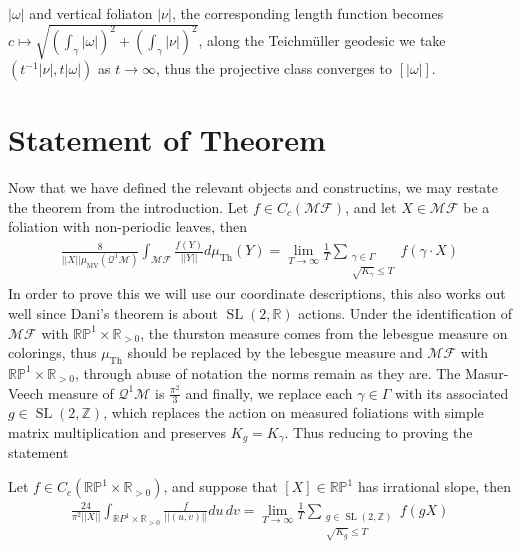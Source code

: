 \documentclass{article}
\newcommand{\abs}[1]{\left\vert#1\right\vert}
\newcommand{\norm}[1]{\lvert\lvert#1\rvert\rvert}
\newcommand{\slr}{\operatorname{SL}(2,\mathbb{R})}
\newcommand{\slz}{\operatorname{SL}(2,\mathbb{Z})}
\begin{document}
\(\abs{\omega}\) and vertical foliaton \(\abs{\nu}\), the corresponding length function becomes \(c \mapsto \sqrt{\left(\int_\gamma \abs{\omega}\right)^2 + \left(\int_\gamma \abs{\nu}\right)^2}\), along the Teichm\"uller geodesic we take \((t^{-1} \abs{\nu},t\abs{\omega})\) as \(t \to \infty\), thus the projective class converges to \([\abs{\omega}]\).

        \section{Statement of Theorem}
        Now that we have defined the relevant objects and constructins, we may restate the theorem from the introduction.
        Let \(f \in C_c(\mathscr{MF})\), and let \(X \in \mathscr{MF}\) be a foliation with non-periodic leaves, then
        \begin{align*}
            \frac{8}{\norm{X}\mu_{\operatorname{MV}}(\mathcal{Q}^1 \mathcal{M})}\int_{\mathscr{MF}}\frac{f(Y)}{\norm{Y}}d\mu_{\operatorname{Th}}(Y) = \lim_{T\to\infty}\frac{1}{T}\sum_{\substack{\gamma \in \Gamma \\ \sqrt{K_\gamma} \leq T}}f(\gamma \cdot X)
        \end{align*}
        In order to prove this we will use our coordinate descriptions, this also works out well since Dani's theorem is about \(\slr\) actions. Under the identification of \(\mathscr{MF}\) with \(\mathbb{RP}^1 \times \mathbb{R}_{>0}\), the thurston measure comes from the lebesgue measure on colorings, thus \(\mu_{\operatorname{Th}}\) should be replaced by the lebesgue measure and \(\mathscr{MF}\) with \(\mathbb{RP}^1 \times \mathbb{R}_{>0}\), through abuse of notation the norms remain as they are. The Masur-Veech measure of \(\mathcal{Q}^1\mathcal{M}\) is \(\frac{\pi^2}{3}\) and finally, we replace each \(\gamma \in \Gamma\) with its associated \(g \in \slz\), which replaces the action on measured foliations with simple matrix multiplication and preserves \(K_g = K_\gamma\). Thus reducing to proving the statement

        Let \(f \in C_c(\mathbb{RP}^1 \times \mathbb{R}_{>0})\), and suppose that \([X] \in \mathbb{RP}^1\) has irrational slope, then
        \begin{align*}
            \frac{24}{\pi^2\norm{X}}\int_{\mathbb{R}P^1\times{\mathbb{R}_{>0}}}\frac{f}{\norm{(u,v)}}du\,dv = \lim_{T\to\infty}\frac{1}{T}\sum_{\substack{g \in \slz \\ \sqrt{K_g} \leq T}}f(g X)
        \end{align*}
\end{document}
